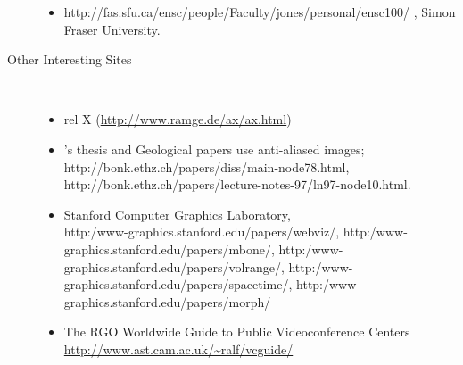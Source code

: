 \begin{description}
\begin{itemize}
\item
{}%
{http://fas.sfu.ca/ensc/people/Faculty/jones/personal/ensc100/}%
, Simon Fraser University.
\html{\smallskip}%

\end{itemize}

\htmlrule[50\% center]



\item[Other Interesting Sites]~%
\begin{itemize}
%
\item {\large rel X} \quad
(\url{http://www.ramge.de/ax/ax.html})
\html{\smallskip}%

\item \Wortmann's thesis and Geological papers use anti-aliased images;\\
{http://bonk.ethz.ch/papers/diss/main-node78.html},
{http://bonk.ethz.ch/papers/lecture-notes-97/ln97-node10.html}.
\html{\smallskip}%

\item
Stanford Computer Graphics Laboratory,
\\
{http:/www-graphics.stanford.edu/papers/webviz/},
{http:/www-graphics.stanford.edu/papers/mbone/},
{http:/www-graphics.stanford.edu/papers/volrange/},
{http:/www-graphics.stanford.edu/papers/spacetime/},
{http:/www-graphics.stanford.edu/papers/morph/}


\item
The RGO Worldwide Guide to Public Videoconference Centers\\
\url{http://www.ast.cam.ac.uk/~ralf/vcguide/}
\html{\smallskip}%

\end{itemize}

\end{description}













